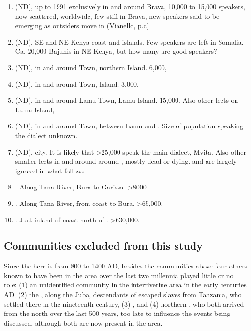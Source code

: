 \documentclass[output=paper
,newtxmath
,modfonts
,nonflat]{langsci/langscibook}
\begin{document}
\begin{enumerate}

\item {} (ND), up to 1991 exclusively in and around Brava, 10,000 to 15,000 speakers, now scattered, worldwide, few still in Brava, new speakers said to be emerging as outsiders move in (Vianello, p.c)

\item {} (ND), SE  and NE Kenya coast and islands. Few speakers are left in Somalia. Ca. 20,000 Bajunis in NE Kenya, but how many are good speakers? 

\item {} (ND), in and around  Town, northern  Island. 6,000, 

\item {} (ND), in and around  Town,  Island. 3,000, 

\item {} (ND), in and around Lamu Town, Lamu Island. 15,000. Also other lects on Lamu Island, 

\item {} (ND), in and around  Town, between Lamu and . Size of population  speaking the dialect unknown. 

\item {} (ND),  city. It is likely that >25,000 speak the main dialect, Mvita. Also other smaller lects in and around around , mostly dead or dying.   and   are largely ignored in what follows.

\item {}. Along Tana River, Bura to Garissa. >8000.

\item {}. Along Tana River, from coast to Bura. >65,000.

\item {}. Just inland of coast north of . >630,000.

\end{enumerate}

\subsection{Communities excluded from this study}\label{sec:nurse:2.4} 

Since the  here is from 800 to 1400 AD, besides the communities above four others known to have been in the area over the last two millennia played little or no role: (1) an unidentified  community in the interriverine area in the early centuries AD, (2) the , along the Juba, descendants of escaped slaves from Tanzania, who settled there in the nineteenth century, (3) , and (4) northern , who both arrived from the north over the last 500 years, too late to influence the events being discussed, although both are now present in the area. 
\end{document}

